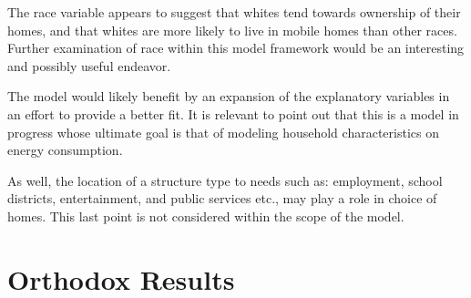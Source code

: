 \documentclass{article}
\begin{document}
The race variable appears to suggest that whites tend towards ownership of their homes, and that whites are more likely to live in mobile homes than other races.  Further examination of race within this model framework would be an interesting and possibly useful endeavor. 

The model would likely benefit by an expansion of the explanatory variables in an effort to provide a better fit.  It is relevant to point out that this is a model in progress whose ultimate goal is that of modeling household characteristics on energy consumption.


As well, the location of a structure type to needs such as: employment, school districts, entertainment, and public services etc., may play a role in choice of homes.  This last point is not considered within the scope of the model.  



\nocite{*}
 


\section{Orthodox Results}\label{OrthResults}
\end{document}
